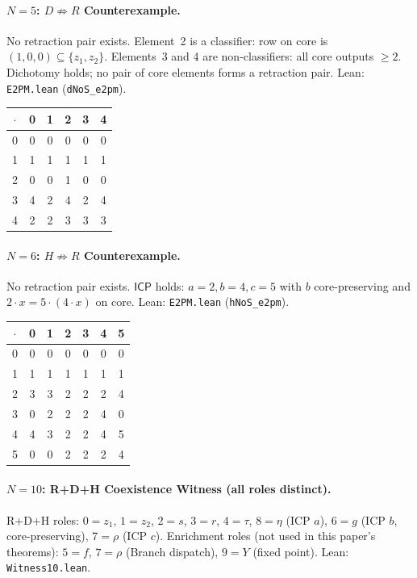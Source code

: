 \documentclass[sigconf,screen]{acmart}
\newcommand{\dotop}{\cdot}
\newcommand{\ICP}{\textsf{ICP}}
\theoremstyle{remark}
\begin{document}
\paragraph{$N\!=\!5$: $D \not\Rightarrow R$ Counterexample.}
No retraction pair exists. Element~2 is a classifier: row on core is $(1,0,0) \subseteq \{z_1, z_2\}$. Elements~3 and 4 are non-classifiers: all core outputs $\geq 2$. Dichotomy holds; no pair of core elements forms a retraction pair. \quad Lean: \texttt{E2PM.lean} (\texttt{dNoS\_e2pm}).

\medskip
{\small
\begin{tabular}{c|ccccc}
$\dotop$ & 0 & 1 & 2 & 3 & 4 \\\hline
0 & 0 & 0 & 0 & 0 & 0 \\
1 & 1 & 1 & 1 & 1 & 1 \\
2 & 0 & 0 & 1 & 0 & 0 \\
3 & 4 & 2 & 4 & 2 & 4 \\
4 & 2 & 2 & 3 & 3 & 3 \\
\end{tabular}}

\paragraph{$N\!=\!6$: $H \not\Rightarrow R$ Counterexample.}
No retraction pair exists. $\ICP$ holds: $a\!=\!2, b\!=\!4, c\!=\!5$ with $b$ core-preserving and $2 \dotop x = 5 \dotop (4 \dotop x)$ on core. \quad Lean: \texttt{E2PM.lean} (\texttt{hNoS\_e2pm}).

\medskip
{\small
\begin{tabular}{c|cccccc}
$\dotop$ & 0 & 1 & 2 & 3 & 4 & 5 \\\hline
0 & 0 & 0 & 0 & 0 & 0 & 0 \\
1 & 1 & 1 & 1 & 1 & 1 & 1 \\
2 & 3 & 3 & 2 & 2 & 2 & 4 \\
3 & 0 & 2 & 2 & 2 & 4 & 0 \\
4 & 4 & 3 & 2 & 2 & 4 & 5 \\
5 & 0 & 0 & 2 & 2 & 2 & 4 \\
\end{tabular}}

\paragraph{$N\!=\!10$: R+D+H Coexistence Witness (all roles distinct).}
R+D+H roles: $0 = z_1$, $1 = z_2$, $2 = s$, $3 = r$, $4 = \tau$, $8 = \eta$ (ICP $a$), $6 = g$ (ICP $b$, core-preserving), $7 = \rho$ (ICP $c$). Enrichment roles (not used in this paper's theorems): $5 = f$, $7 = \rho$ (Branch dispatch), $9 = Y$ (fixed point). \quad Lean: \texttt{Witness10.lean}.
\end{document}
